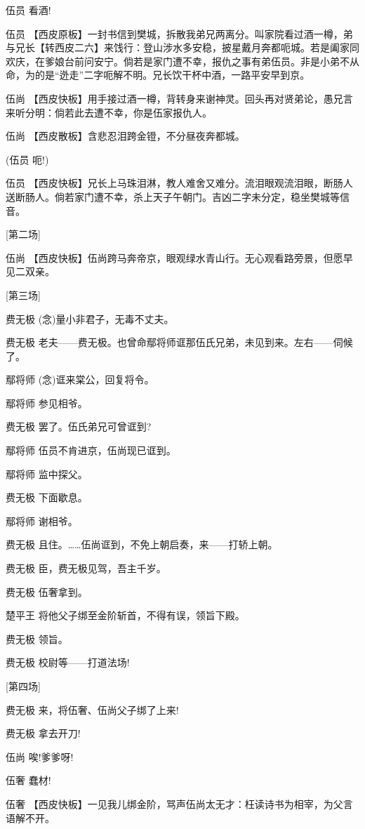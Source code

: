 伍员 看酒!

伍员
【西皮原板】一封书信到樊城，拆散我弟兄两离分。叫家院看过酒一樽，弟与兄长【转西皮二六】来饯行：登山涉水多安稳，披星戴月奔都呃城。若是阖家同欢庆，在爹娘台前问安宁。倘若是家门遭不幸，报仇之事有弟伍员。非是小弟不从命，为的是``迯走''二字呃解不明。兄长饮干杯中酒，一路平安早到京。

伍尚
【西皮快板】用手接过酒一樽，背转身来谢神灵。回头再对贤弟论，愚兄言来听分明：倘若此去遭不幸，你是伍家报仇人。

伍尚 【西皮散板】含悲忍泪跨金镫，不分昼夜奔都城。

(伍员 呃!)

伍员
【西皮快板】兄长上马珠泪淋，教人难舍又难分。流泪眼观流泪眼，断肠人送断肠人。倘若家门遭不幸，杀上天子午朝门。吉凶二字未分定，稳坐樊城等信音。

{[}第二场{]}

伍尚
【西皮快板】伍尚跨马奔帝京，眼观绿水青山行。无心观看路旁景，但愿早见二双亲。

{[}第三场{]}

费无极 (念)量小非君子，无毒不丈夫。

费无极
老夫------费无极。也曾命鄢将师诓那伍氏兄弟，未见到来。左右------伺候了。

鄢将师 (念)诓来棠公，回复将令。

鄢将师 参见相爷。

费无极 罢了。伍氏弟兄可曾诓到?

鄢将师 伍员不肯进京，伍尚现已诓到。

鄢将师 监中探父。

费无极 下面歇息。

鄢将师 谢相爷。

费无极 且住。\ldots{}\ldots{}伍尚诓到，不免上朝启奏，来------打轿上朝。

费无极 臣，费无极见驾，吾主千岁。

费无极 伍奢拿到。

楚平王 将他父子绑至金阶斩首，不得有误，领旨下殿。

费无极 领旨。

费无极 校尉等------打道法场!

{[}第四场{]}

费无极 来，将伍奢、伍尚父子绑了上来!

费无极 拿去开刀!

伍尚 唉!爹爹呀!

伍奢 蠢材!

伍奢
【西皮快板】一见我儿绑金阶，骂声伍尚太无才：枉读诗书为相宰，为父言语解不开。

